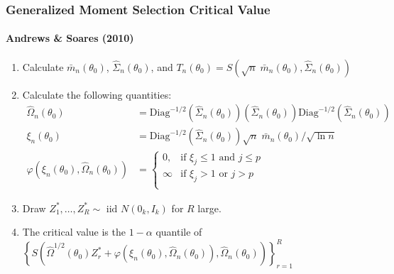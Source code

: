 \documentclass{beamer}
\begin{document}
\begin{frame}
  \frametitle{Generalized Moment Selection Critical Value}
  \framesubtitle{Andrews \& Soares (2010)}
  \small
\begin{enumerate}
  \item Calculate $\bar{m}_n(\theta_0)$, $\widehat{\Sigma}_n(\theta_0)$, and $T_n(\theta_0) = S\left( \sqrt{n}\; \bar{m}_n(\theta_0), \widehat{\Sigma}_n(\theta_0) \right)$
  \item Calculate the following quantities:
    \begin{align*}
      \widehat{\Omega}_n(\theta_0) &= \mbox{Diag}^{-1/2}\left(\widehat{\Sigma}_n(\theta_0)  \right)\left(\widehat{\Sigma}_n(\theta_0)\right)\mbox{Diag}^{-1/2}\left( \widehat{\Sigma}_n(\theta_0) \right)\\
      \xi_n(\theta_0) &= \mbox{Diag}^{-1/2}\left( \widehat{\Sigma}_n(\theta_0) \right) \sqrt{n}\; \bar{m}_n(\theta_0) / \sqrt{\ln n}\\
      \varphi\left( \xi_n(\theta_0), \widehat{\Omega}_n(\theta_0) \right) &= \left\{
      \begin{array}{cc}
        0, & \mbox{if } \xi_j \leq 1 \mbox{ and } j \leq p \\
        \infty & \mbox{if } \xi_j > 1 \mbox{ or } j > p\\
      \end{array}
      \right.
    \end{align*}
  \item Draw $Z_1^*, \hdots, Z_R^* \sim \mbox{ iid } N(0_k, I_k)$ for $R$ large.
  \item The critical value is the $1 - \alpha$ quantile of $\left\{S\left( \widehat{\Omega}^{1/2}(\theta_0) Z_r^* + \varphi\left( \xi_n(\theta_0), \widehat{\Omega}_n(\theta_0) \right), \widehat{\Omega}_n(\theta_0) \right)\right\}_{r=1}^R$
\end{enumerate}
\end{frame}
\end{document}
